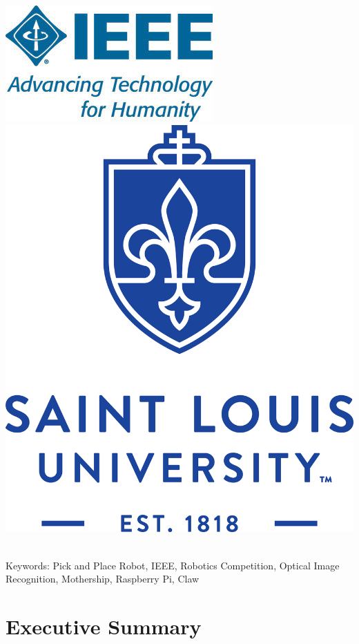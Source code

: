 \documentclass[12pt]{article}
\begin{document}
\begin{center}\includegraphics[scale=0.5]{ieee} \hspace{1cm} \includegraphics[scale=0.15]{slu}\\~\\\end{center}

\noindent Keywords: Pick and Place Robot, IEEE, Robotics Competition, Optical Image Recognition, Mothership, Raspberry Pi, Claw
\thispagestyle{empty}
\pagebreak

\thispagestyle{empty}
\tableofcontents
\pagebreak

\cleardoublepage
\setcounter{page}{1}

\section{Executive Summary}
\end{document}
